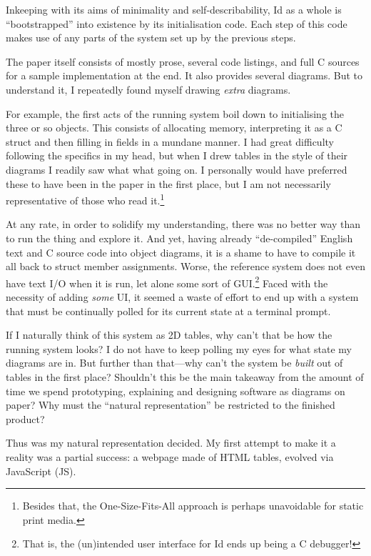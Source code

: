 \vspace{-0.1em}

Inkeeping with its aims of minimality and self-describability, Id as a
whole is ``bootstrapped'' into existence by its initialisation code.
Each step of this code makes use of any parts of the system set up by
the previous steps.

The paper itself consists of mostly prose, several code listings, and
full C sources for a sample implementation at the end. It also provides
several diagrams. But to understand it, I repeatedly found myself
drawing \emph{extra} diagrams.

For example, the first acts of the running system boil down to
initialising the three or so objects. This consists of allocating
memory, interpreting it as a C struct and then filling in fields in a
mundane manner. I had great difficulty following the specifics in my
head, but when I drew tables in the style of their diagrams I readily
saw what what going on. I personally would have preferred these to have
been in the paper in the first place, but I am not necessarily
representative of those who read it.\footnote{Besides that, the
  One-Size-Fits-All{} approach is perhaps unavoidable for static print
  media.}

At any rate, in order to solidify my understanding, there was no better
way than to run the thing and explore it. And yet, having already
``de-compiled'' English text and C source code into object diagrams, it
is a shame to have to compile it all back to struct member assignments.
Worse, the reference system does not even have text I/O when it is run,
let alone some sort of GUI.\footnote{That is, the (un)intended user
  interface for Id ends up being a C debugger!} Faced with the necessity
of adding \emph{some} UI, it seemed a waste of effort to end up with a
system that must be continually polled for its current state at a
terminal prompt.

If I naturally think of this system as 2D tables, why can't that be how
the running system looks? I do not have to keep polling my eyes for what
state my diagrams are in. But further than that---why can't the system
be \emph{built} out of tables in the first place? Shouldn't this be the
main takeaway from the amount of time we spend prototyping, explaining
and designing software as diagrams on paper? Why must the ``natural
representation'' be restricted to the finished product?

Thus was my natural representation decided. My first attempt to make it
a reality was a partial success: a webpage made of HTML tables, evolved
via JavaScript (JS).

